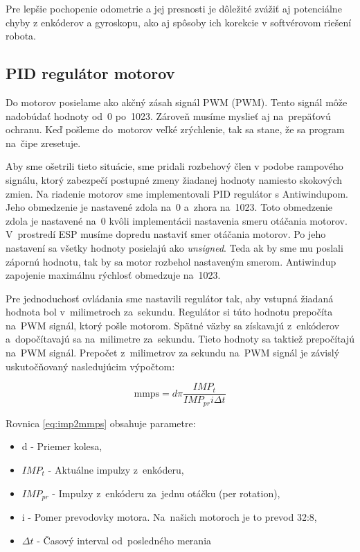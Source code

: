 Pre lepšie pochopenie odometrie a jej presnosti je dôležité zvážiť aj potenciálne chyby z enkóderov a gyroskopu, ako aj spôsoby ich korekcie v softvérovom riešení robota.


\subsection{PID regulátor motorov}
\label{subsec:pid}

Do motorov posielame ako akčný zásah signál PWM (\acrlong{PWM}). Tento signál môže nadobúdať hodnoty od~0 po~1023.
Zároveň musíme myslieť aj na~prepäťovú ochranu. Keď pošleme do~motorov veľké zrýchlenie, tak sa stane, že sa program
na~čipe zresetuje.

Aby sme ošetrili tieto situácie, sme pridali rozbehový člen v podobe rampového signálu, ktorý zabezpečí postupné zmeny žiadanej hodnoty namiesto skokových zmien. Na riadenie motorov sme implementovali PID regulátor s Antiwindupom. 
Jeho obmedzenie je nastavené zdola na~0 a~zhora na~1023. Toto obmedzenie zdola je nastavené na~0 kvôli implementácii nastavenia smeru
otáčania motorov. V~prostredí ESP musíme dopredu nastaviť smer otáčania motorov. Po jeho nastavení sa všetky hodnoty
posielajú ako \textit{unsigned}. Teda ak by sme mu poslali zápornú hodnotu, tak by sa motor rozbehol nastaveným smerom.
Antiwindup zapojenie maximálnu rýchlosť obmedzuje na~1023.

Pre jednoduchosť ovládania sme nastavili regulátor tak, aby vstupná žiadaná hodnota bol v~milimetroch za~sekundu.
Regulátor si túto hodnotu prepočíta na~PWM signál, ktorý pošle motorom. Spätné väzby sa získavajú z~enkóderov
a~dopočítavajú sa na~milimetre za~sekundu. Tieto hodnoty sa taktiež prepočítajú na~PWM signál. Prepočet z~milimetrov
za sekundu na~PWM signál je závislý uskutočňovaný nasledujúcim výpočtom:

\begin{equation}
	\text{mmps} = d \pi \frac{IMP_t}{IMP_{pr} i \Delta t}
	\label{eq:imp2mmps}
\end{equation}

Rovnica \ref{eq:imp2mmps} obsahuje parametre:
\begin{itemize}
	\item d - Priemer kolesa,
	\item $IMP_t$ - Aktuálne impulzy z~enkóderu,
	\item $IMP_{pr}$ - Impulzy z~enkóderu za~jednu otáčku (per rotation),
	\item i - Pomer prevodovky motora. Na~našich motoroch je to prevod 32:8,
	\item $\Delta t$ - Časový interval od~posledného merania
\end{itemize}

